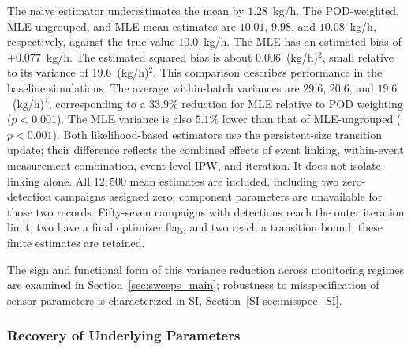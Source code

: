 \documentclass[numsec,webpdf,modern,mediumone]{oup-authoring-template}
\newcommand{\new}[1]{#1}
\newcommand{\edit}[1]{#1}
\begin{document}
\edit{The naive estimator underestimates the mean by $1.28$~kg/h. The POD-weighted, MLE-ungrouped, and MLE mean estimates are $10.01$, $9.98$, and $10.08$~kg/h, respectively, against the true value $10.0$~kg/h. The MLE has an estimated bias of $+0.077$~kg/h. The estimated squared bias is about $0.006$~(kg/h)$^2$, small relative to its variance of $19.6$~(kg/h)$^2$. This comparison describes performance in the baseline simulations. The average within-batch variances are $29.6$, $20.6$, and $19.6$~(kg/h)$^2$, corresponding to a $33.9\%$ reduction for MLE relative to POD weighting ($p<0.001$). The MLE variance is also $5.1\%$ lower than that of MLE-ungrouped ($p<0.001$). Both likelihood-based estimators use the persistent-size transition update; their difference reflects the combined effects of event linking, within-event measurement combination, event-level IPW, and iteration. It does not isolate linking alone. All $12{,}500$ mean estimates are included, including two zero-detection campaigns assigned zero; component parameters are unavailable for those two records. Fifty-seven campaigns with detections reach the outer iteration limit, two have a final optimizer flag, and two reach a transition bound; these finite estimates are retained.}

\new{The sign and functional form of this variance reduction across monitoring regimes are examined in Section~\ref{sec:sweeps_main}; robustness to misspecification of sensor parameters is characterized in SI, Section~\ref{SI-sec:misspec_SI}.}

\subsubsection{Recovery of Underlying Parameters}
\end{document}
